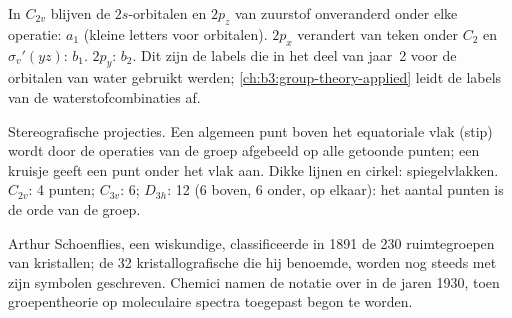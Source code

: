 \begin{example}\label{ex:b3:point-groups:water-orbitals}
In $C_{2v}$ blijven de $2s$-orbitalen en $2p_z$ van zuurstof onveranderd
onder elke operatie: $a_1$ (kleine letters voor orbitalen). $2p_x$ verandert
van teken onder $C_2$ en
$\sigma_v'(yz)$: $b_1$. $2p_y$: $b_2$. Dit zijn de labels die in het deel
van jaar~2 voor de orbitalen van water gebruikt werden;
\cref{ch:b3:group-theory-applied} leidt de labels van de
waterstofcombinaties af.
\end{example}

\begin{omfigure}

{\small Stereografische projecties. Een algemeen punt boven het
equatoriale vlak (stip) wordt door de operaties van de groep afgebeeld op
alle getoonde punten; een kruisje geeft een punt onder het vlak aan. Dikke
lijnen en cirkel: spiegelvlakken. $C_{2v}$: 4 punten; $C_{3v}$: 6; $D_{3h}$: 12 (6 boven, 6
onder, op elkaar): het aantal punten is de orde van de groep.}
\end{omfigure}

\begin{history}
Arthur Schoenflies, een wiskundige, classificeerde in 1891 de 230
ruimtegroepen van kristallen; de 32 kristallografische  die hij
benoemde, worden nog steeds met zijn symbolen geschreven. Chemici namen de
notatie over in de jaren 1930, toen groepentheorie op moleculaire spectra
toegepast begon te worden.
\end{history}

